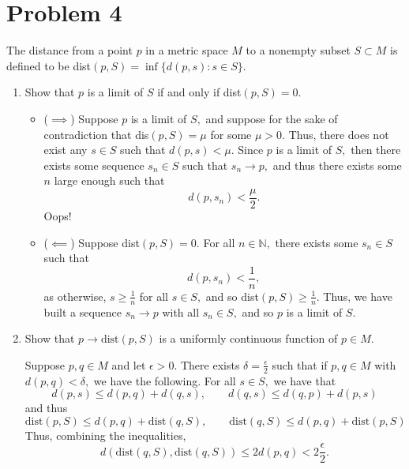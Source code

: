 \documentclass[11pt]{article}
\newcommand{\bbN}{\mathbb{N}}
\begin{document}
\section*{Problem 4}
\begin{problem}
    The distance from a point $p$ in a metric space $M$ to a nonempty subset $S \subset M$ is defined to be dist$(p,S)=\inf\{d(p,s):s \in S\}$.
\end{problem}
\begin{enumerate}
    \item 
    \begin{problem}
        Show that $p$ is a limit of $S$ if and only if dist$(p,S)=0.$
    \end{problem}
\begin{solution}
    \begin{itemize}
        \item ($\implies$) Suppose $p$ is a limit of $S,$ and suppose for the sake of contradiction that dis$(p,S) =\mu$ for some $\mu >0.$ Thus, there does not exist any $s\in S$ such that $d(p,s)<\mu.$ Since $p$ is a limit of $S,$ then there exists some sequence $s_n \in S$ such that $s_n \to p,$ and thus there exists some $n$ large enough such that \[d(p,s_n) < \frac{\mu}{2}.\] Oops! 
        \item ($\impliedby$) Suppose dist$(p,S) = 0.$ For all $n\in \bbN,$ there exists some $s_n \in S$ such that \[d(p,s_n)< \frac{1}{n},\] as otherwise, $s \geq \frac{1}{n}$ for all $s\in S,$ and so dist$(p,S)\geq \frac{1}{n}.$ Thus, we have built a sequence $s_n \to p$ with all $s_n \in S,$ and so $p$ is a limit of $S.$ 
    \end{itemize}
\end{solution}
    \item 
    \begin{problem}
        Show that $p\to \text{dist}(p,S)$ is a uniformly continuous function of $p \in M$.
    \end{problem}
    \begin{solution}
        Suppose $p,q \in M$ and let $\epsilon>0.$ There exists $\delta = \frac{\epsilon}{2}$ such that if $p,q\in M$ with $d(p,q)<\delta,$ we have the following.
        For all $s\in S,$ we have that \[d(p,s)\leq d(p,q) + d(q,s),\qquad d(q,s) \leq d(q,p) + d(p,s)\] and thus 
        \[\text{dist}(p,S) \leq d(p,q) + \text{dist}(q,S),\qquad \text{dist}(q,S) \leq d(p,q) + \text{dist}(p,S)\] Thus, combining the inequalities, 
        \[d(\text{dist}(q,S), \text{dist}(q,S)) \leq 2d(p,q)< 2 \frac{\epsilon}{2}.\]
    \end{solution}
\end{enumerate}
\end{document}
